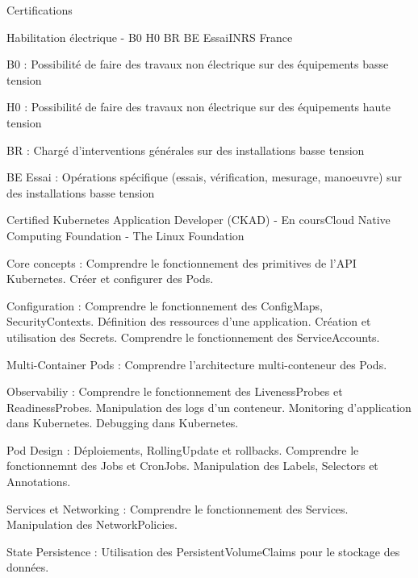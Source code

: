 \documentclass[
	11pt, %
]{resume} %
\begin{document}
\begin{rSection}{Certifications}

    \begin{rSubsection}{Habilitation électrique - B0 H0 BR BE Essai}{INRS France}{}{}
        \item B0 : Possibilité de faire des travaux non électrique sur des équipements basse tension 
        \item H0 : Possibilité de faire des travaux non électrique sur des équipements haute tension
        \item BR : Chargé d'interventions générales sur des installations basse tension 
        \item BE Essai : Opérations spécifique (essais, vérification, mesurage, manoeuvre) sur des installations basse tension
    \end{rSubsection}

    \begin{rSubsection}{Certified Kubernetes Application Developer (CKAD) - En cours}{Cloud Native Computing Foundation - The Linux Foundation}{}{}
        \item Core concepts : Comprendre le fonctionnement des primitives de l'API Kubernetes. Créer et configurer des Pods.
        \item Configuration : Comprendre le fonctionnement des ConfigMaps, SecurityContexts. Définition des ressources d'une application. Création et utilisation des Secrets. 
		Comprendre le fonctionnement des ServiceAccounts.
        \item Multi-Container Pods : Comprendre l'architecture multi-conteneur des Pods.
        \item Observabiliy : Comprendre le fonctionnement des LivenessProbes et ReadinessProbes. Manipulation des logs d'un conteneur. 
		Monitoring d'application dans Kubernetes. Debugging dans Kubernetes.
        \item Pod Design : Déploiements, RollingUpdate et rollbacks. Comprendre le fonctionnemnt des Jobs et CronJobs. Manipulation des Labels, Selectors et Annotations.
        \item Services et Networking : Comprendre le fonctionnement des Services. Manipulation des NetworkPolicies.
        \item State Persistence : Utilisation des PersistentVolumeClaims pour le stockage des données.
    \end{rSubsection}

\end{rSection}
\end{document}
